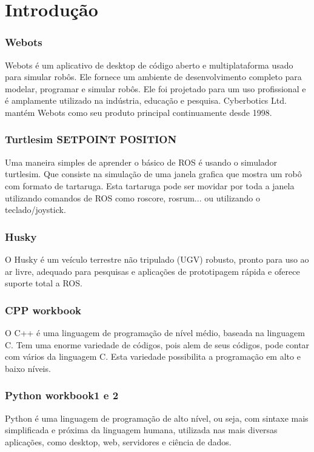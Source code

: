 \chapter{Introdução}
\label{chap:intro}
\subsection{Webots}
Webots é um aplicativo de desktop de código aberto e multiplataforma usado para simular robôs. 
Ele fornece um ambiente de desenvolvimento completo para modelar, programar e simular robôs.
Ele foi projetado para um uso profissional e é amplamente utilizado na indústria, educação e pesquisa.
Cyberbotics Ltd. mantém Webots como seu produto principal continuamente desde 1998.
\subsection{Turtlesim SETPOINT POSITION }
Uma maneira simples de aprender o básico de ROS é usando o simulador turtlesim. Que consiste na simulação 
de uma janela grafica que mostra um robô com formato de tartaruga. Esta tartaruga pode ser movidar por 
toda a janela utilizando comandos de ROS como roscore, rosrum... ou utilizando o teclado/joystick.
\subsection{Husky}
O Husky é um veículo terrestre não tripulado (UGV) robusto, pronto para uso ao ar livre, adequado para 
pesquisas e aplicações de prototipagem rápida e oferece suporte total a ROS.
\subsection{CPP workbook}
O C++ é uma linguagem de programação de nível médio, baseada na linguagem C.
Tem uma enorme variedade de códigos, pois alem de seus códigos, pode contar com vários da linguagem C.
Esta variedade possibilita a programação em alto e baixo níveis.
\subsection{Python workbook1 e 2}
Python é uma linguagem de programação de alto nível, ou seja, com sintaxe mais simplificada e próxima da 
linguagem humana, utilizada nas mais diversas aplicações, como desktop, web, servidores e ciência de dados.
